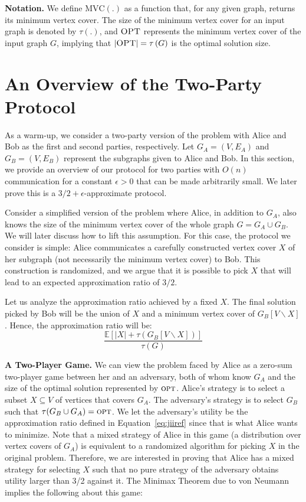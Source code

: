 \documentclass[11pt]{article}
\newcommand{\E}[0]{\ensuremath{\mathbb{E}}}
\newcommand{\opt}{\ensuremath{\textsc{opt}}}
\newcommand{\OPT}{\ensuremath{\textsc{OPT}}}
\newcommand{\mvc}[1]{\tau\left(#1 \right)}
\newcommand{\MVC}{\text{MVC}}
\begin{document}
\noindent \textbf{Notation.} We define $\MVC(.)$ as a function that, for any given graph, returns its minimum vertex cover. The size of the minimum vertex cover for an input graph is denoted by $\mvc{.}$, and $\OPT$ represents the minimum vertex cover of the input  graph $G$, implying that $|\OPT| = \mvc{G}$ is the optimal solution size. 
 
\section{An Overview of the Two-Party Protocol}
\label{sec:warmup}

As a warm-up, we consider a two-party version of the problem with
Alice and Bob as the first and second parties, respectively. Let \(
G_A=(V, E_A) \) and \( G_B=(V, E_B) \) represent the subgraphs given
to Alice and Bob. In this section, we provide an overview of our
protocol for two parties with $O(n)$ communication for a
constant $\epsilon > 0$ that can be made arbitrarily small. We later prove this is a \(3/2 +
\epsilon\)-approximate protocol. 

Consider a simplified version of the problem where Alice, in addition
to \( G_A \), also knows the size of the minimum vertex cover of the
whole graph \( G = G_A \cup G_B \). We will later discuss how to lift
this assumption. For this case, the protocol we consider is simple:
Alice communicates a carefully constructed vertex cover \( X \) of her
subgraph (not necessarily the minimum vertex cover) to Bob.  This
construction is randomized, and we argue that it is possible to
pick \( X \) that will lead to an expected approximation ratio of
\(3/2\).



Let us analyze the approximation ratio achieved by a fixed \( X\). The final solution picked by Bob will be the union of \( X \) and
a minimum vertex cover of \( G_B[V \backslash X] \). Hence, the
approximation ratio will be:
\begin{equation} \label{eq:jiiref}
    \frac{\E[|X|+\mvc{G_B[V \backslash X]}]}{\mvc{G}}
\end{equation}

\noindent \textbf{A Two-Player Game.}  
We can view the problem faced by Alice as a zero-sum two-player game
between her and an adversary, both of whom know \( G_A \) and the size
of the optimal solution represented by \(\opt\). Alice's strategy is
to select a subset \( X \subseteq V \) of vertices that covers \( G_A
\). The adversary's strategy is to select \( G_B \) such that
\(\tau(G_B \cup G_A)=\opt\). We let the adversary's utility be the
approximation ratio defined in Equation~\ref{eq:jiiref} since that is
what Alice wants to minimize. Note that a mixed strategy of Alice in
this game (a distribution over vertex covers of \( G_A \)) is
equivalent to a randomized algorithm for picking \( X \) in the
original problem. Therefore, we are interested in proving that Alice
has a mixed strategy for selecting \( X \) such that no pure strategy
of the adversary obtains utility larger than 3/2 against it. The Minimax Theorem due to von Neumann~\cite{vonNeumann:1928:TGG}
implies the following about this game:
\end{document}

